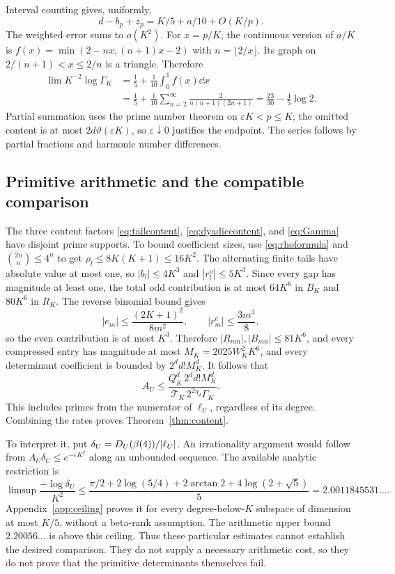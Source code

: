 Interval counting gives, uniformly,
\[
 d-b_p+z_p=K/5+a/10+O(K/p).
\]
The weighted error sums to $o(K^2)$. For $x=p/K$, the continuous
version of $a/K$ is
$f(x)=\min(2-nx,(n+1)x-2)$ with $n=\lfloor2/x\rfloor$.
Its graph on $2/(n+1)<x\leq2/n$ is a triangle. Therefore
\begin{align}
 \lim K^{-2}\log\Gamma_K
 &=\frac15+\frac1{10}\int_0^1f(x)\dd x\nonumber\\
 &=\frac15+\frac1{10}\sum_{n=2}^{\infty}
                       \frac2{n(n+1)(2n+1)}
 =\frac{23}{30}-\frac45\log2.\label{eq:Gammarate}
\end{align}
Partial summation uses the prime number theorem on
$\varepsilon K<p\leq K$; the omitted content is at most
$2d\vartheta(\varepsilon K)$, so $\varepsilon\downarrow0$ justifies
the endpoint. The series follows by partial fractions and harmonic
number differences.

\subsection{Primitive arithmetic and the compatible comparison}
The three content factors \eqref{eq:tailcontent},
\eqref{eq:dyadiccontent}, and \eqref{eq:Gamma} have disjoint prime
supports. To bound coefficient sizes, use \eqref{eq:rhoformula} and
$\binom{2n}{n}\leq4^n$ to get $\rho_l\leq8K(K+1)\leq16K^2$.
The alternating finite tails have absolute value at most one, so
$|b_l|\leq4K^3$ and $|r_l^o|\leq5K^3$. Since every gap has magnitude
at least one, the total odd contribution is at most $64K^6$ in $B_K$
and $80K^6$ in $R_K$. The reverse binomial bound gives
\[
 |e_m|\leq\frac{(2K+1)^2}{8m^2},\qquad
 |r_m^e|\leq\frac{3m^3}{8},
\]
so the even contribution is at most $K^3$. Therefore
$|R_{mn}|,|B_{mn}|\leq81K^6$, and every
compressed entry has magnitude at most
$M_K=2025W_K^2K^6$, and every determinant coefficient is bounded by
$2^dd!M_K^d$. It follows that
\begin{equation}\label{eq:finalfinite}
 A_U\leq
 \frac{Q_K^d\,2^dd!M_K^d}{\mathcal T_K\,2^{2\eta_d}\Gamma_K}.
\end{equation}
This includes primes from the numerator of $\ell_U$, regardless of
its degree. Combining the rates proves Theorem~\ref{thm:content}.

To interpret it, put $\delta_U=D_U(\beta(4))/|\ell_U|$. An
irrationality argument would follow from $A_U\delta_U\leq
e^{-\varepsilon K^2}$ along an unbounded sequence. The available
analytic restriction is
\begin{equation}\label{eq:ceiling}
 \limsup\frac{-\log\delta_U}{K^2}
 \leq\frac{\pi/2+2\log(5/4)+2\arctan2+4\log(2+\sqrt5)}5
 =2.0011845531\ldots.
\end{equation}
Appendix~\ref{app:ceiling} proves it for every degree-below-$K$
subspace of dimension at most $K/5$, without a beta-rank assumption.
The arithmetic upper bound $2.20056\ldots$ is above this ceiling.
Thus these particular estimates cannot establish the desired
comparison. They do not supply a necessary arithmetic cost, so they
do not prove that the primitive determinants themselves fail.
